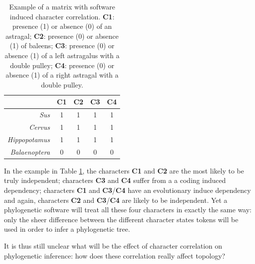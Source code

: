 \documentclass[12pt,letterpaper]{article}
\begin{document}
\begin{table}
\center
    \begin{tabular}{r|cccc}
            & C1 & C2 & C3 & C4\\
        \hline
        \textit{Sus} & 1 & 1 & 1 & 1\\
        \textit{Cervus} & 1 & 1 & 1 & 1\\
        \textit{Hippopotamus} & 1 & 1 & 1 & 1\\
        \textit{Balaenoptera} & 0 & 0 & 0 & 0\\
    \end{tabular}
    \caption{Example of a matrix with software induced character correlation. \textbf{C1}: presence (1) or absence (0) of an astragal; \textbf{C2}: presence (0) or absence (1) of baleens; \textbf{C3}: presence (0) or absence (1) of a left astragalus with a double pulley; \textbf{C4}: presence (0) or absence (1) of a right astragal with a double pulley.}
    \label{Tab:example_matrix}
\end{table}

In the example in Table \ref{Tab:example_matrix}, the characters \textbf{C1} and \textbf{C2} are the most likely to be truly independent; characters \textbf{C3} and \textbf{C4} suffer from a a coding induced dependency; characters \textbf{C1} and \textbf{C3}/\textbf{C4} have an evolutionary induce dependency and again, characters \textbf{C2} and \textbf{C3}/\textbf{C4} are likely to be independent.
Yet a phylogenetic software will treat all these four characters in exactly the same way: only the sheer difference between the different character states tokens will be used in order to infer a phylogenetic tree.

It is thus still unclear what will be the effect of character correlation on phylogenetic inference: how does these correlation really affect topology?
\end{document}
